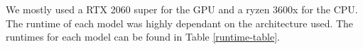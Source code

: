 We mostly used a RTX 2060 super for the GPU and a ryzen 3600x for the CPU. The runtime of each model was highly dependant on the architecture used. The runtimes for each model can be found in Table \ref{runtime-table}.

  
    
        
    
    
